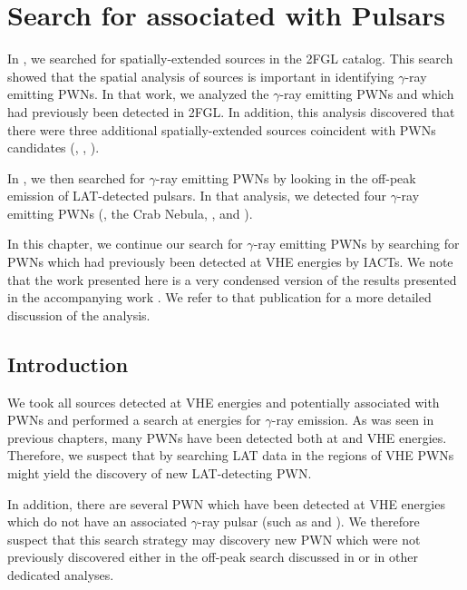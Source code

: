 \chapter{Search for  associated with \tev Pulsars}


In , we searched for spatially-extended sources
in the 2FGL catalog.  This search showed that the spatial analysis
of \fermi sources is important in identifying $\gamma$-ray emitting
\acp{PWN}.  In that work, we analyzed the $\gamma$-ray emitting \acp{PWN}
 and \mshfifteenfiftytwo which had previously been detected
in \ac{2FGL}.  In addition, this analysis discovered that there were three
additional spatially-extended \fermi sources coincident with \acp{PWN}
candidates (, , ).

In , we then searched for $\gamma$-ray emitting \acp{PWN}
by looking in the off-peak emission of \ac{LAT}-detected pulsars. In
that analysis, we detected four $\gamma$-ray emitting \acp{PWN} (\velax,
the Crab Nebula, \mshfifteenfiftytwo, and \threecfiftyeight).

In this chapter, we continue our search for $\gamma$-ray emitting
\acp{PWN} by searching for \acp{PWN} which had previously been detected at
\ac{VHE} energies by \acp{IACT}. We note that the work presented here is a
very condensed version of the results presented in the accompanying work
\citep{acero_2013a_constraints-galactic}.  We refer to that publication
for a more detailed discussion of the analysis.

\section{Introduction}

We took all sources detected at \ac{VHE} energies and potentially
associated with \acp{PWN} and performed a search at \gev energies for
$\gamma$-ray emission. As was seen in previous chapters, many \acp{PWN}
have been detected both at \gev and \ac{VHE} energies. Therefore,
we suspect that by searching \ac{LAT} data in the regions of \ac{VHE}
\acp{PWN} might yield the discovery of new LAT-detecting \ac{PWN}.

In addition, there are several \ac{PWN} which have been detected at
\ac{VHE} energies which do not have an associated $\gamma$-ray pulsar
(such as  and ).  We therefore suspect that this
search strategy may discovery new \ac{PWN} which were not previously
discovered either in the off-peak search discussed in 
or in other dedicated analyses.

